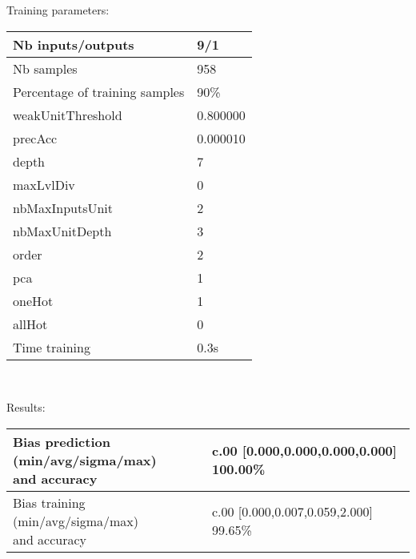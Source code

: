 Training parameters:\\
\begin{center}
\begin{tabular}{|l|l|}
\hline
Nb inputs/outputs&9/1\\
\hline
Nb samples&958\\
\hline
Percentage of training samples&90\%\\
\hline
weakUnitThreshold&0.800000\\
\hline
precAcc&0.000010\\
\hline
depth&7\\
\hline
maxLvlDiv&0\\
\hline
nbMaxInputsUnit&2\\
\hline
nbMaxUnitDepth&3\\
\hline
order&2\\
\hline
pca&1\\
\hline
oneHot&1\\
\hline
allHot&0\\
\hline
Time training&0.3s\\
\hline
\end{tabular}\\
\end{center}\newline
Results:
\begin{center}
\begin{tabular}{|l|l|}
\hline
\makecell{Bias prediction (min/avg/sigma/max)\\and accuracy}&\makecell{c.00 [0.000,0.000,0.000,0.000] 100.00\%\\
}\\

\hline
\makecell{Bias training (min/avg/sigma/max)\\and accuracy}&\makecell{c.00 [0.000,0.007,0.059,2.000] 99.65\%\\
}\\
\hline
\end{tabular}\
\end{center}
